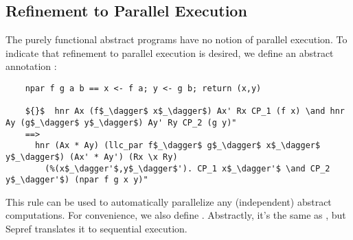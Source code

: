 \documentclass[a4paper,UKenglish,cleveref, autoref, thm-restate]{lipics-v2021}
\begin{document}
  \subsection{Refinement to Parallel Execution}
  The purely functional abstract programs have no notion of parallel execution.
  To indicate that refinement to parallel execution is desired, we define an abstract annotation
  :
  \begin{lstlisting}
    npar f g a b == x <- f a; y <- g b; return (x,y)

    ${}$  hnr Ax (f$_\dagger$ x$_\dagger$) Ax' Rx CP_1 (f x) \and hnr Ay (g$_\dagger$ y$_\dagger$) Ay' Ry CP_2 (g y)"
    ==>
      hnr (Ax * Ay) (llc_par f$_\dagger$ g$_\dagger$ x$_\dagger$ y$_\dagger$) (Ax' * Ay') (Rx \x Ry)
        (%(x$_\dagger'$,y$_\dagger$'). CP_1 x$_\dagger'$ \and CP_2 y$_\dagger'$) (npar f g x y)"
  \end{lstlisting}
  This rule can be used to automatically parallelize any (independent) abstract computations.
  For convenience, we also define . Abstractly, it's the same as ,
  but Sepref translates it to sequential execution.
\end{document}
